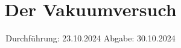 

\subject{V70}
\title{Der Vakuumversuch}
\date{%
  Durchführung: 23.10.2024
  \hspace{3em}
  Abgabe: 30.10.2024
}




\maketitle
\thispagestyle{empty}
\tableofcontents
\newpage







\printbibliography{}


